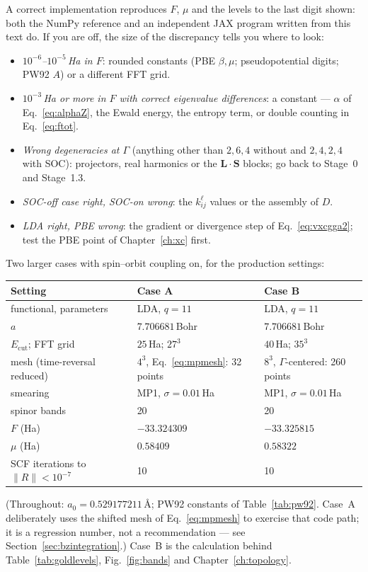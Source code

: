 A correct implementation reproduces $F$, $\mu$ and the levels to the last
digit shown: both the NumPy reference and an independent JAX program
written from this text do. If you are off, the size of the discrepancy
tells you where to look:
\begin{itemize}[leftmargin=2em]
\item \emph{$10^{-6}$--$10^{-5}$\,Ha in $F$}: rounded constants (PBE
$\beta,\mu$; pseudopotential digits; PW92 $A$) or a different FFT grid.
\item \emph{$10^{-3}$\,Ha or more in $F$ with correct eigenvalue
differences}: a constant --- $\alpha$ of Eq.~\eqref{eq:alphaZ}, the Ewald
energy, the entropy term, or double counting in Eq.~\eqref{eq:ftot}.
\item \emph{Wrong degeneracies at $\Gamma$} (anything other than $2,6,4$
without and $2,4,2,4$ with SOC): projectors, real harmonics or the
$\mathbf L\cdot\mathbf S$ blocks; go back to Stage~0 and Stage~1.3.
\item \emph{SOC-off case right, SOC-on wrong}: the $k^\ell_{ij}$ values or
the assembly of $D$.
\item \emph{LDA right, PBE wrong}: the gradient or divergence step of
Eq.~\eqref{eq:vxcgga2}; test the PBE point of Chapter~\ref{ch:xc} first.
\end{itemize}

Two larger cases with spin--orbit coupling on, for the production
settings:
\begin{center}\small
\begin{tabular}{@{}lll@{}}
\toprule
Setting & Case A & Case B\\
\midrule
functional, parameters & LDA, $q=11$ & LDA, $q=11$\\
$a$ & $7.706681$\,Bohr & $7.706681$\,Bohr\\
$E_{\mathrm{cut}}$; FFT grid & $25$\,Ha; $27^3$ & $40$\,Ha; $35^3$\\
mesh (time-reversal reduced) & $4^3$, Eq.~\eqref{eq:mpmesh}: 32 points & $8^3$, $\Gamma$-centered: 260 points\\
smearing & MP1, $\sigma=0.01$\,Ha & MP1, $\sigma=0.01$\,Ha\\
spinor bands & 20 & 20\\
\midrule
$F$ (Ha) & $-33.324309$ & $-33.325815$\\
$\mu$ (Ha) & $0.58409$ & $0.58322$\\
SCF iterations to $\|R\|<10^{-7}$ & 10 & 10\\
\bottomrule
\end{tabular}
\end{center}
(Throughout: $a_0 = 0.529177211$\,\AA; PW92 constants of
Table~\ref{tab:pw92}. Case~A deliberately uses the shifted mesh of
Eq.~\eqref{eq:mpmesh} to exercise that code path; it is a regression
number, not a recommendation --- see Section~\ref{sec:bzintegration}.)
Case~B is the calculation behind
Table~\ref{tab:goldlevels}, Fig.~\ref{fig:bands} and
Chapter~\ref{ch:topology}.

